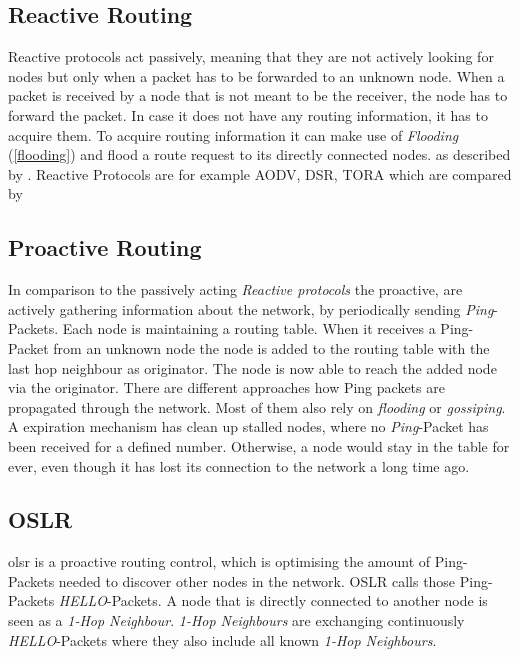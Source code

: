 \subsection{Reactive Routing}
Reactive protocols act passively, meaning that they are not actively looking for nodes but only when a packet has to be forwarded to an unknown node.
When a packet is received by a node that is not meant to be the receiver, the node has to forward the packet. In case it does not have any routing information, it has to acquire them. 
To acquire routing information it can make use of \textit{Flooding} (\cref{flooding}) and flood a route request to its directly connected nodes.  as described by \citet[\S1.3]{Mukhija_Arun}. 
Reactive Protocols are for example AODV, DSR, TORA which are compared by \citet{kalwar_2010}

\subsection{Proactive Routing}
In comparison to the passively acting \textit{Reactive protocols} the proactive, are actively gathering information about the network, by periodically sending \textit{Ping}-Packets. Each node is maintaining a routing table. When it receives a Ping-Packet from an unknown node the node is added to the routing table with the last hop neighbour as originator. The node is now able to reach the added node via the originator. 
There are different approaches how Ping packets are propagated through the network. Most of them also rely on \textit{flooding} or \textit{gossiping}.
A expiration mechanism has clean up stalled nodes, where no \textit{Ping}-Packet has been received for a defined number. Otherwise, a node would stay in the table for ever, even though it has lost its connection to the network a long time ago.

\subsection{OSLR}\label{sec:mesh-oslr}
\gls{olsr} is a proactive routing control, which is optimising the amount of Ping-Packets needed to discover other nodes in the network. OSLR calls those Ping-Packets \textit{HELLO}-Packets.
A node that is directly connected to another node is seen as a \textit{1-Hop Neighbour}. \textit{1-Hop Neighbours} are exchanging continuously \textit{HELLO}-Packets where they also include all known \textit{1-Hop Neighbours}.

